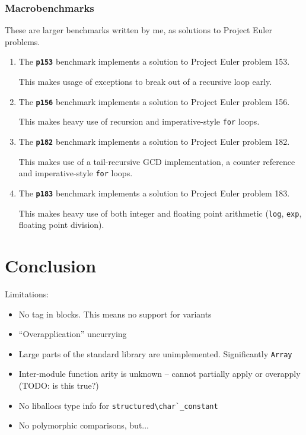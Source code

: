 \documentclass[12pt,a4paper,twoside,openright]{report}
\begin{document}
\subsection{Macrobenchmarks}
These are larger benchmarks written by me, as solutions to Project Euler problems.

\begin{enumerate}
\item

The \textbf{\texttt{p153}} benchmark implements a solution to Project Euler problem 153.

This makes usage of exceptions to break out of a recursive loop early.

\item
  The \textbf{\texttt{p156}} benchmark implements a solution to Project Euler problem 156.

This makes heavy use of recursion and imperative-style \lstinline!for! loops.

\item
  The \textbf{\texttt{p182}} benchmark implements a solution to Project Euler problem 182.

This makes use of a tail-recursive GCD implementation, a counter reference and imperative-style \lstinline!for! loops.

\item
  The \textbf{\texttt{p183}} benchmark implements a solution to Project Euler problem 183.

This makes heavy use of both integer and floating point arithmetic (\lstinline!log!, \lstinline!exp!, floating point division).
\end{enumerate}

\chapter{Conclusion}\label{conclusion}

Limitations:

\begin{itemize}
  \item No tag in blocks. This means no support for variants
  \item ``Overapplication'' uncurrying
  \item Large parts of the standard library are unimplemented. Significantly \lstinline!Array!
  \item Inter-module function arity is unknown -- cannot partially apply or overapply (TODO: is this true?)
  \item No liballocs type info for \lstinline!structured\char`_constant!
  \item No polymorphic comparisons, but...

\end{itemize}
\end{document}
